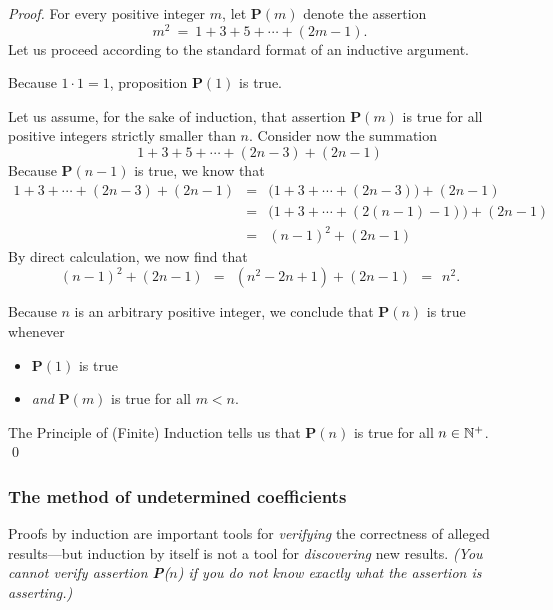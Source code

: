 \begin{proof}
For every positive integer $m$, let {\bf P}$(m)$ denote the assertion
\[ m^2 \ = \ 1 + 3 + 5 + \cdots + (2m-1). \]
Let us proceed according to the standard format of an inductive
argument.

Because $1 \cdot 1 = 1$, proposition {\bf P}$(1)$ is true.

Let us assume, for the sake of induction, that assertion {\bf
  P}$(m)$ is true for all positive integers strictly smaller than $n$.
Consider now the summation
\[ 1 + 3 + 5 + \cdots + (2n-3) + (2n-1) \]
Because {\bf P}$(n-1)$ is true, we know that
\begin{eqnarray*}
1 + 3 + \cdots + (2n-3) + (2n-1)
  & = & 
\big(1 + 3 + \cdots + (2n-3) \big) + (2n-1) \\
  & = &
\big(1 + 3 + \cdots + (2(n-1) -1) \big) + (2n-1) \\
  & = & (n-1)^2 + (2n-1)
\end{eqnarray*}
By direct calculation, we now find that
\[ (n-1)^2 + (2n-1) \ \ = \ \ (n^2 -2n +1) + (2n-1) \ \ = \ \ n^2. \]

\noindent
Because $n$ is an arbitrary positive integer, we conclude that
{\bf P}$(n)$ is true whenever
\begin{itemize}
\item
{\bf P}$(1)$ is true
\item
{\em and}
{\bf P}$(m)$ is true for all $m < n$.
\end{itemize}
The Principle of (Finite) Induction tells us that {\bf P}$(n)$
is true for all $n \in \mathbb{N}^+$.  \qed
\end{proof}


\subsubsection{The method of undetermined coefficients}
\label{sec:undetermined-coefficients1}


Proofs by induction are important tools for {\em verifying} the
correctness of alleged results---but induction by itself is not a tool
for {\em discovering} new results.  {\em (You cannot {\em verify}
  assertion {\bf P}($n$) if you do not know {\em exactly} what the
  assertion is asserting.)}

